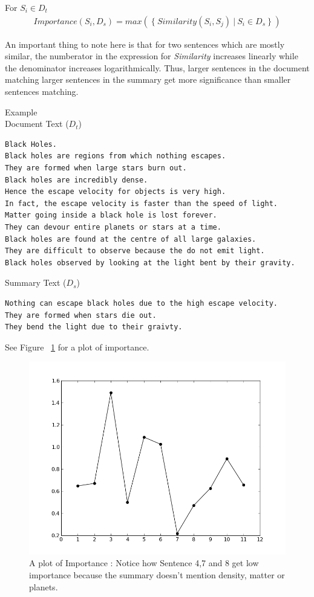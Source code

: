 \documentclass[paper=a4, fontsize=11pt]{scrartcl} %
\numberwithin{equation}{section} %
\numberwithin{figure}{section} %
\numberwithin{table}{section} %
\begin{document}
For $S_i \in D_t$ 
\begin{align}
Importance(S_i,D_s) = max(\ \{\ Similarity(S_i,S_j)\ |\ S_i \in D_s\ \}\ )  
\end{align}

An important thing to note here is that for two sentences which are mostly similar, the numberator in the expression for \emph{Similarity} increases linearly while the denominator increases logarithmically. Thus, larger sentences in the document matching larger sentences in the  summary get more significance than smaller sentences matching.\\
\par
{{\large Example}} \\
{Document Text ($D_t$)}
\begin{lstlisting}
Black Holes.
Black holes are regions from which nothing escapes.
They are formed when large stars burn out.
Black holes are incredibly dense.
Hence the escape velocity for objects is very high.
In fact, the escape velocity is faster than the speed of light.
Matter going inside a black hole is lost forever.
They can devour entire planets or stars at a time.
Black holes are found at the centre of all large galaxies.
They are difficult to observe because the do not emit light.
Black holes observed by looking at the light bent by their gravity.
\end{lstlisting}
 \vspace{1.2em}
{Summary Text ($D_s$)}
\begin{lstlisting}
Nothing can escape black holes due to the high escape velocity.
They are formed when stars die out.
They bend the light due to their graivty.
\end{lstlisting}
See Figure ~\ref{fig:importance} for a plot of importance.

\begin{figure}[h!]
  \centering
    \includegraphics[width=.75\textwidth]{images/importance}
    \caption{A plot of Importance : Notice how Sentence 4,7 and 8 get low importance because the summary doesn't mention density, matter or planets.}
    \label{fig:importance}
\end{figure}
\pagebreak
\end{document}
